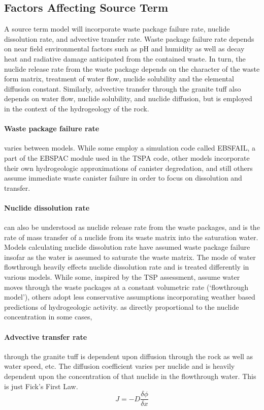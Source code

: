 \subsection{Factors Affecting Source Term}
A source term model will incorporate waste package failure rate, nuclide dissolution rate, and 
advective transfer rate. Waste package failure rate depends on near field environmental factors such 
as pH and humidity as well as decay heat and radiative damage anticipated from the contained waste. 
In turn, the nuclide release rate from the waste package depends on the character of the waste form 
matrix, treatment of water flow, nuclide solubility and the elemental diffusion constant. Similarly, 
advective transfer through the granite tuff also depends on water flow, nuclide solubility, and 
nuclide diffusion, but is employed in the context of the hydrogeology of the rock.   
\paragraph{Waste package failure rate} varies between models. While some employ a simulation code 
called EBSFAIL, a part of the EBSPAC module used in the TSPA code, other models incorporate their 
own hydrogeologic approximations of canister degredation, and still others assume immediate waste 
canister failure in order to focus on dissolution and transfer.  \newline



\paragraph{Nuclide dissolution rate} can also be understood as nuclide release rate from the waste 
packages, and is the rate of mass transfer of a nuclide from its waste matrix into the saturation 
water. Models calculating  nuclide dissolution rate have assumed waste package failure insofar as 
the water is assumed to saturate the waste matrix. The mode of water flowthrough heavily effects 
nuclide dissolution rate and is treated differently in various models. While some, inspired by the 
TSP assessment, assume water moves through the waste packages at a constant volumetric rate 
(`flowthrough model'), others adopt less conservative assumptions incorporating weather based 
predictions of hydrogeologic activity. as directly proportional to the nuclide concentration in some 
cases,  \paragraph{Advective transfer rate} through the granite tuff is dependent upon diffusion 
through the rock as well as water speed, etc. The diffusion coefficient varies per nuclide and is 
heavily dependent upon the concentration of that nuclide in the flowthrough water. This is just 
Fick's First Law.  \begin{equation}
J = -D\frac{\delta\phi}{\delta x}
\end{equation}
